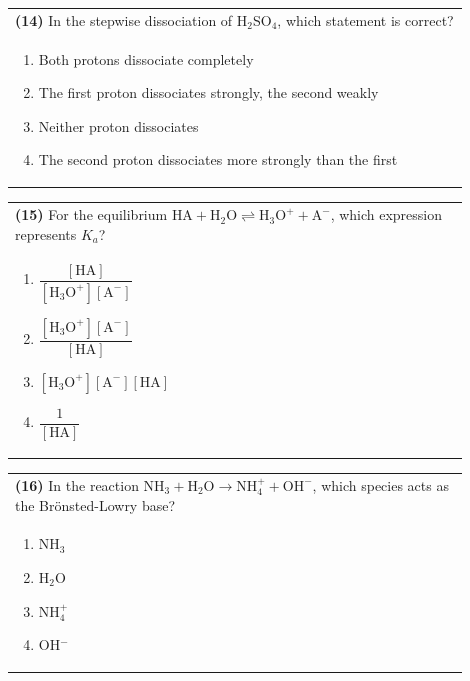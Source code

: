 \documentclass{article}
\begin{document}
\noindent\begin{tabular}{|p{0.9\linewidth}|}
\hline
\textbf{(14)} In the stepwise dissociation of H$_2$SO$_4$, which statement is correct? \\[0.2cm]
\begin{minipage}{0.85\linewidth}
\begin{enumerate}[label=\alph*.]
\item Both protons dissociate completely \item The first proton dissociates strongly, the second weakly \item Neither proton dissociates \item The second proton dissociates more strongly than the first
\end{enumerate}
\end{minipage}\\[0.2cm]
\hline
\end{tabular}

\noindent\begin{tabular}{|p{0.9\linewidth}|}
\hline
\textbf{(15)} For the equilibrium $\text{HA} + \text{H}_2\text{O} \rightleftharpoons \text{H}_3\text{O}^+ + \text{A}^-$, which expression represents $K_a$? \\[0.2cm]
\begin{minipage}[t]{0.85\linewidth}
\begin{enumerate}[label=\alph*.]
\item $\dfrac{[\text{HA}]}{[\text{H}_3\text{O}^+][\text{A}^-]}$ \item $\dfrac{[\text{H}_3\text{O}^+][\text{A}^-]}{[\text{HA}]}$ \item $[\text{H}_3\text{O}^+][\text{A}^-][\text{HA}]$ \item $\dfrac{1}{[\text{HA}]}$
\end{enumerate}
\end{minipage}\\[0.2cm]
\hline
\end{tabular}

\noindent\begin{tabular}{|p{0.9\linewidth}|}
\hline
\textbf{(16)} In the reaction $\text{NH}_3 + \text{H}_2\text{O} \rightarrow \text{NH}_4^+ + \text{OH}^-$, which species acts as the Brönsted-Lowry base?\\[0.2cm]
\begin{minipage}[t]{0.85\linewidth}
\begin{enumerate}[label=\alph*.]
\item NH$_3$
\item H$_2$O
\item NH$_4^+$
\item OH$^-$
\end{enumerate}
\end{minipage}\\[0.2cm]
\hline
\end{tabular}
\newpage
\end{document}
